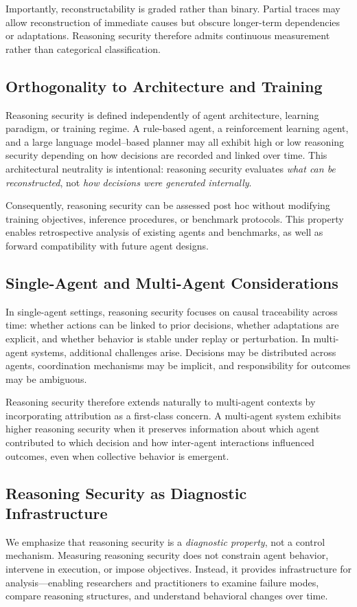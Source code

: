 \documentclass[11pt]{article}
\begin{document}
Importantly, reconstructability is graded rather than binary. Partial traces may allow reconstruction of immediate causes but obscure longer-term dependencies or adaptations. Reasoning security therefore admits continuous measurement rather than categorical classification.

\subsection{Orthogonality to Architecture and Training}
Reasoning security is defined independently of agent architecture, learning paradigm, or training regime. A rule-based agent, a reinforcement learning agent, and a large language model--based planner may all exhibit high or low reasoning security depending on how decisions are recorded and linked over time. This architectural neutrality is intentional: reasoning security evaluates \emph{what can be reconstructed}, not \emph{how decisions were generated internally}.

Consequently, reasoning security can be assessed post hoc without modifying training objectives, inference procedures, or benchmark protocols. This property enables retrospective analysis of existing agents and benchmarks, as well as forward compatibility with future agent designs.

\subsection{Single-Agent and Multi-Agent Considerations}
In single-agent settings, reasoning security focuses on causal traceability across time: whether actions can be linked to prior decisions, whether adaptations are explicit, and whether behavior is stable under replay or perturbation. In multi-agent systems, additional challenges arise. Decisions may be distributed across agents, coordination mechanisms may be implicit, and responsibility for outcomes may be ambiguous.

Reasoning security therefore extends naturally to multi-agent contexts by incorporating attribution as a first-class concern. A multi-agent system exhibits higher reasoning security when it preserves information about which agent contributed to which decision and how inter-agent interactions influenced outcomes, even when collective behavior is emergent.

\subsection{Reasoning Security as Diagnostic Infrastructure}
We emphasize that reasoning security is a \emph{diagnostic property}, not a control mechanism. Measuring reasoning security does not constrain agent behavior, intervene in execution, or impose objectives. Instead, it provides infrastructure for analysis---enabling researchers and practitioners to examine failure modes, compare reasoning structures, and understand behavioral changes over time.
\end{document}
